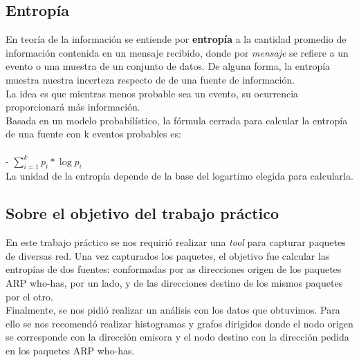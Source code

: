 \subsection{Entropía}

\indent \indent En teoría de la información se entiende por \textbf{entropía} a la cantidad promedio de información contenida en un mensaje recibido, donde por \textit{mensaje} se refiere a un evento o una muestra de un conjunto de datos. De alguna forma, la entropía muestra nuestra incerteza respecto de de una fuente de información.\\
\indent La idea es que mientras menos probable sea un evento, su ocurrencia proporcionará más información.\\
\indent Basada en un modelo probabilístico, la fórmula cerrada para calcular la entropía de una fuente con k eventos probables es:\\
\\
\indent \indent \indent \indent \indent \indent \indent \indent \indent \indent - $\sum \limits_{i=1}^k p_i * \log{p_i}$ \\

\newline
\indent La unidad de la entropía depende de la base del logartimo elegida para calcularla.\\

\subsection{Sobre el objetivo del trabajo práctico}

\indent \indent En este trabajo práctico se nos requirió realizar una \textit{tool} para capturar paquetes de diversas red. Una vez capturados los paquetes, el objetivo fue calcular las entropías de dos fuentes: conformadas por as direcciones origen de los paquetes ARP who-has, por un lado, y de las direcciones destino de los mismos paquetes por el otro.\\
\indent Finalmente, se nos pidió realizar un análisis con los datos que obtuvimos. Para ello se nos recomendó realizar histogramas y grafos dirigidos donde el nodo origen se corresponde con la dirección emisora y el nodo destino con la dirección pedida en los paquetes ARP who-has.